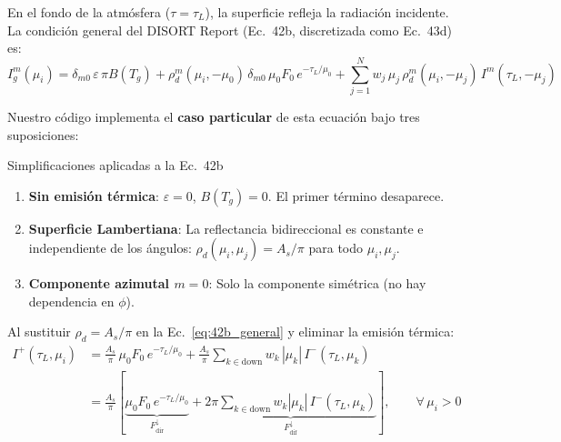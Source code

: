 \documentclass[a4paper,11pt]{article}
\begin{document}
En el fondo de la atm\'osfera ($\tau = \tau_L$), la superficie refleja la radiaci\'on incidente.  La condici\'on general del DISORT Report (Ec.\ 42b, discretizada como Ec.\ 43d) es:
\begin{equation}
I_g^m(\mu_i) = \delta_{m0}\,\varepsilon\,\pi B(T_g) + \rho_d^m(\mu_i, -\mu_0)\,\delta_{m0}\,\mu_0 F_0\,e^{-\tau_L/\mu_0} + \sum_{j=1}^{N} w_j\,\mu_j\,\rho_d^m(\mu_i, -\mu_j)\,I^m(\tau_L, -\mu_j)
\label{eq:42b_general}
\end{equation}

Nuestro c\'odigo implementa el \textbf{caso particular} de esta ecuaci\'on bajo tres suposiciones:

\begin{concept}{Simplificaciones aplicadas a la Ec.\ 42b}
\begin{enumerate}
\item \textbf{Sin emisi\'on t\'ermica}: $\varepsilon = 0$, $B(T_g) = 0$.  El primer t\'ermino desaparece.
\item \textbf{Superficie Lambertiana}: La reflectancia bidireccional es constante e independiente de los \'angulos: $\rho_d(\mu_i, \mu_j) = A_s / \pi$ para todo $\mu_i, \mu_j$.
\item \textbf{Componente azimutal $m = 0$}: Solo la componente sim\'etrica (no hay dependencia en $\phi$).
\end{enumerate}
\end{concept}

Al sustituir $\rho_d = A_s/\pi$ en la Ec.~\eqref{eq:42b_general} y eliminar la emisi\'on t\'ermica:
\begin{align}
I^{+}(\tau_L, \mu_i) &= \frac{A_s}{\pi}\,\mu_0 F_0\,e^{-\tau_L/\mu_0} + \frac{A_s}{\pi}\sum_{k \in \text{down}} w_k\,|\mu_k|\,I^{-}(\tau_L, \mu_k) \nonumber \\
&= \frac{A_s}{\pi} \left[ \underbrace{\mu_0 F_0 \, e^{-\tau_L / \mu_0}}_{F_{\text{dir}}^{\downarrow}} + \underbrace{2\pi \sum_{k \in \text{down}} w_k |\mu_k| \, I^{-}(\tau_L, \mu_k)}_{F_{\text{dif}}^{\downarrow}} \right], \qquad \forall \, \mu_i > 0
\label{eq:bc_boa}
\end{align}
\end{document}
